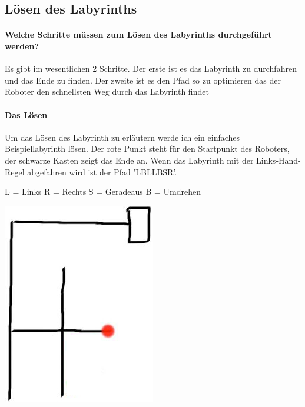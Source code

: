 \documentclass[12pt]{article}
\begin{document}
\subsection{Lösen des Labyrinths}
\paragraph{Welche Schritte müssen zum Lösen des Labyrinths durchgeführt werden?} 
Es gibt im wesentlichen 2 Schritte. Der erste ist es das Labyrinth zu durchfahren und das Ende zu finden. Der zweite ist es den Pfad so zu optimieren das der Roboter den schnellsten Weg durch das Labyrinth findet

\paragraph{Das Lösen}
Um das Lösen des Labyrinth zu erläutern werde ich  ein einfaches Beispiellabyrinth lösen. Der rote Punkt steht für den Startpunkt des Roboters, der schwarze Kasten zeigt das Ende an. Wenn das Labyrinth mit der Links-Hand-Regel abgefahren wird ist der Pfad 'LBLLBSR'.
\par
L = Links
R = Rechts
S = Geradeaus
B = Umdrehen

\includegraphics[width=0.8 \textwidth]{images/example_maze.png}
\end{document}
